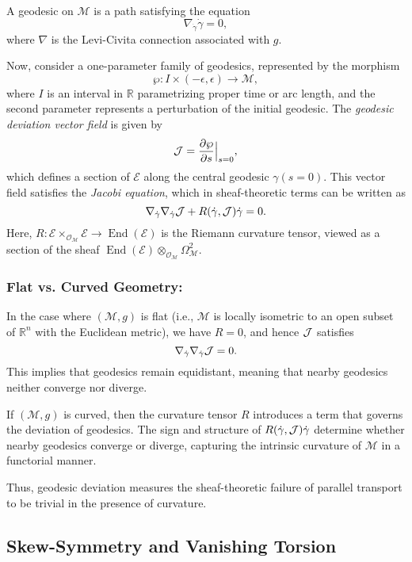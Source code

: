 A geodesic on $\mathcal{M}$ is a path satisfying the equation
\[
\nabla_{\dot{\gamma}} \dot{\gamma} = 0,
\]
where $\nabla$ is the Levi-Civita connection associated with $g$.

Now, consider a one-parameter family of geodesics, represented by the morphism
\[
\wp: I \times (-\epsilon, \epsilon) \to \mathcal{M},
\]
where $I$ is an interval in $\mathbb{R}$ parametrizing proper time or arc length, and the second parameter represents a perturbation of the initial geodesic. The \emph{geodesic deviation vector field} is given by
\[
\mathcal{J} = \frac{\partial \wp}{\partial s} \Big|_{s=0},
\]
which defines a section of $\mathcal{E}$ along the central geodesic $\gamma(s=0)$. This vector field satisfies the \emph{Jacobi equation}, which in sheaf-theoretic terms can be written as
\[
\nabla_{\dot{\gamma}} \nabla_{\dot{\gamma}} \mathcal{J} + R(\dot{\gamma}, \mathcal{J}) \dot{\gamma} = 0.
\]
Here, $R: \mathcal{E} \times_{\mathcal{O}_{\mathcal{M}}} \mathcal{E} \to \operatorname{End}(\mathcal{E})$ is the Riemann curvature tensor, viewed as a section of the sheaf $\operatorname{End}(\mathcal{E}) \otimes_{\mathcal{O}_{\mathcal{M}}} \Omega^2_{\mathcal{M}}$.

\subsubsection{Flat vs. Curved Geometry:}
In the case where $(\mathcal{M}, g)$ is flat (i.e., $\mathcal{M}$ is locally isometric to an open subset of $\mathbb{R}^n$ with the Euclidean metric), we have $R = 0$, and hence $\mathcal{J}$ satisfies
\[
\nabla_{\dot{\gamma}} \nabla_{\dot{\gamma}} \mathcal{J} = 0.
\]
This implies that geodesics remain equidistant, meaning that nearby geodesics neither converge nor diverge.

If $(\mathcal{M}, g)$ is curved, then the curvature tensor $R$ introduces a term that governs the deviation of geodesics. The sign and structure of $R(\dot{\gamma}, \mathcal{J}) \dot{\gamma}$ determine whether nearby geodesics converge or diverge, capturing the intrinsic curvature of $\mathcal{M}$ in a functorial manner.

Thus, geodesic deviation measures the sheaf-theoretic failure of parallel transport to be trivial in the presence of curvature.




\subsection{Skew-Symmetry and Vanishing Torsion}


